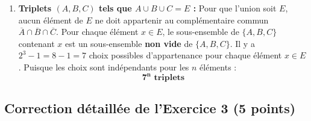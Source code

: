 \documentclass[11pt,a4paper]{article}
\begin{document}
\begin{correctionbox}
\begin{enumerate}
    \item \textbf{Triplets $(A, B, C)$ tels que $A \cup B \cup C = E$ :}
    Pour que l'union soit $E$, aucun élément de $E$ ne doit appartenir au complémentaire commun $\overline{A} \cap \overline{B} \cap \overline{C}$.
    Pour chaque élément $x \in E$, le sous-ensemble de $\{A, B, C\}$ contenant $x$ est un sous-ensemble \textbf{non vide} de $\{A, B, C\}$.
    Il y a $2^3 - 1 = 8 - 1 = 7$ choix possibles d'appartenance pour chaque élément $x \in E$.
    Puisque les choix sont indépendants pour les $n$ éléments :
    \[
    \mathbf{7^n\text{ triplets}}
    \]
\end{enumerate}
\end{correctionbox}

\vspace{0.4cm}

\subsection*{Correction détaillée de l'Exercice 3 \hfill (5 points)}
\end{document}
